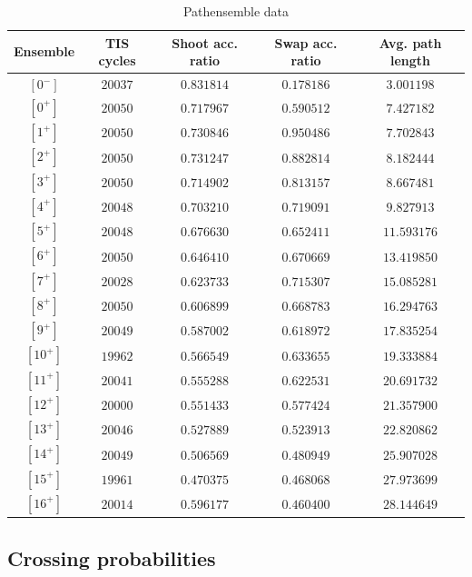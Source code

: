 \documentclass[a4paper]{article}
\begin{document}
\begin{longtable}{| c | c | c | c | c |}
\caption{Pathensemble data}\\
\hline
Ensemble & TIS cycles & Shoot acc. ratio & Swap acc. ratio & Avg. path length\\ \hline
$ [0^-]  $ & $  20037   $ & $ 0.831814 $ & $ 0.178186 $ & $ 3.001198 $\\
$ [0^+]  $ & $  20050   $ & $ 0.717967 $ & $ 0.590512 $ & $ 7.427182 $\\
$ [1^+]  $ & $  20050   $ & $ 0.730846 $ & $ 0.950486 $ & $ 7.702843 $\\
$ [2^+]  $ & $  20050   $ & $ 0.731247 $ & $ 0.882814 $ & $ 8.182444 $\\
$ [3^+]  $ & $  20050   $ & $ 0.714902 $ & $ 0.813157 $ & $ 8.667481 $\\
$ [4^+]  $ & $  20048   $ & $ 0.703210 $ & $ 0.719091 $ & $ 9.827913 $\\
$ [5^+]  $ & $  20048   $ & $ 0.676630 $ & $ 0.652411 $ & $11.593176 $\\
$ [6^+]  $ & $  20050   $ & $ 0.646410 $ & $ 0.670669 $ & $13.419850 $\\
$ [7^+]  $ & $  20028   $ & $ 0.623733 $ & $ 0.715307 $ & $15.085281 $\\
$ [8^+]  $ & $  20050   $ & $ 0.606899 $ & $ 0.668783 $ & $16.294763 $\\
$ [9^+]  $ & $  20049   $ & $ 0.587002 $ & $ 0.618972 $ & $17.835254 $\\
$ [10^+] $ & $  19962   $ & $ 0.566549 $ & $ 0.633655 $ & $19.333884 $\\
$ [11^+] $ & $  20041   $ & $ 0.555288 $ & $ 0.622531 $ & $20.691732 $\\
$ [12^+] $ & $  20000   $ & $ 0.551433 $ & $ 0.577424 $ & $21.357900 $\\
$ [13^+] $ & $  20046   $ & $ 0.527889 $ & $ 0.523913 $ & $22.820862 $\\
$ [14^+] $ & $  20049   $ & $ 0.506569 $ & $ 0.480949 $ & $25.907028 $\\
$ [15^+] $ & $  19961   $ & $ 0.470375 $ & $ 0.468068 $ & $27.973699 $\\
$ [16^+] $ & $  20014   $ & $ 0.596177 $ & $ 0.460400 $ & $28.144649 $\\
\hline
\end{longtable}
\clearpage


\subsection{Crossing probabilities}
\end{document}
